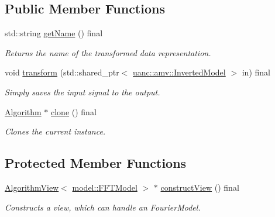 \subsection*{Public Member Functions}
\begin{DoxyCompactItemize}
\item 
std\+::string \hyperlink{classuanc_1_1amv_1_1signal_1_1algorithm_1_1_f_f_t_transformation_algorithm_a07338debb7f34446fba77b6982174727}{get\+Name} () final
\begin{DoxyCompactList}\small\item\em Returns the name of the transformed data representation. \end{DoxyCompactList}\item 
void \hyperlink{classuanc_1_1amv_1_1signal_1_1algorithm_1_1_f_f_t_transformation_algorithm_a0748e30e870a462a10220cb07c784f2a}{transform} (std\+::shared\+\_\+ptr$<$ \hyperlink{classuanc_1_1amv_1_1_inverted_model}{uanc\+::amv\+::\+Inverted\+Model} $>$ in) final
\begin{DoxyCompactList}\small\item\em Simply saves the input signal to the output. \end{DoxyCompactList}\item 
\hyperlink{classuanc_1_1amv_1_1_algorithm}{Algorithm} $\ast$ \hyperlink{classuanc_1_1amv_1_1signal_1_1algorithm_1_1_f_f_t_transformation_algorithm_a8829e808c4bd019564c9ba874e7b7bf0}{clone} () final
\begin{DoxyCompactList}\small\item\em Clones the current instance. \end{DoxyCompactList}\end{DoxyCompactItemize}
\subsection*{Protected Member Functions}
\begin{DoxyCompactItemize}
\item 
\hyperlink{classuanc_1_1amv_1_1_algorithm_view}{Algorithm\+View}$<$ \hyperlink{classuanc_1_1amv_1_1signal_1_1model_1_1_f_f_t_model}{model\+::\+F\+F\+T\+Model} $>$ $\ast$ \hyperlink{classuanc_1_1amv_1_1signal_1_1algorithm_1_1_f_f_t_transformation_algorithm_aec3ff4f92dfabd6e2bce66a10ab7b569}{construct\+View} () final
\begin{DoxyCompactList}\small\item\em Constructs a view, which can handle an Fourier\+Model. \end{DoxyCompactList}\end{DoxyCompactItemize}


